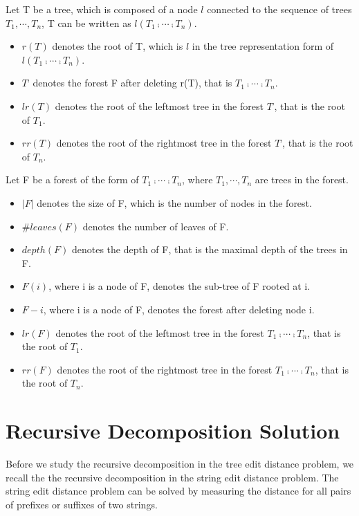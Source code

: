\begin{notation} Let T be a tree, which is composed of a node $l$ connected to the sequence of trees $T_1, \cdots ,T_n$, T can be written as $l(T_1  \comp \cdots \comp T_n)$.
\begin{itemize}
\item $r(T)$ denotes the root of T, which is $l$ in the tree representation form of $l(T_1 \comp \cdots \comp T_n)$.
\item $T^{\comp}$ denotes the forest F after deleting r(T), that is $T_1 \comp \cdots \comp T_n$.
\item $lr(T)$ denotes the root of the leftmost tree in the forest $T^{\comp}$, that is the root of $T_1$.
\item $rr(T)$ denotes the root of the rightmost tree in the forest $T^{\comp}$, that is the root of $T_n$.
\end{itemize}
\end{notation}

\begin{notation}Let F be a forest of the form of $T_1 \comp \cdots \comp T_n$, where $T_1, \cdots ,T_n$ are trees in the forest.

\begin{itemize}
\item $\left\vert F \right\vert$ denotes the size of F, which is the number of nodes in the forest.
\item $\#leaves(F)$ denotes the number of leaves of F.
\item $depth(F)$ denotes the depth of F, that is the maximal depth of the trees in F.
\item $F(i)$, where i is a node of F, denotes the sub-tree of F rooted at i.
\item $F - i$, where i is a node of F, denotes the forest after deleting node i.
\item $lr(F)$ denotes the root of the leftmost tree in the forest $T_1 \comp \cdots \comp T_n$, that is the root of $T_1$.
\item $rr(F)$ denotes the root of the rightmost tree in the forest $T_1 \comp \cdots \comp T_n$, that is the root of $T_n$.
\end{itemize}
\end{notation}

\section{Recursive Decomposition Solution}
Before we study the recursive decomposition in the tree edit distance problem, we recall the the recursive decomposition in the string edit distance problem. The string edit distance problem can be solved by measuring the distance for all pairs of prefixes or suffixes of two strings.

